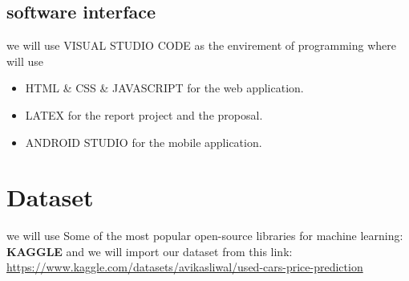 \documentclass[]{report}   %
\begin{document}
\subsection{software interface}
we will use VISUAL STUDIO CODE as the envirement of programming where will use 
\begin{itemize}
  \item [\ding{228}] HTML \& CSS \& JAVASCRIPT for the web application.\\ 
  \item [\ding{228}]  LATEX for the report project and the proposal.\\
  \item [\ding{228}]  ANDROID STUDIO for the mobile application.\\
\end{itemize}
  \section{Dataset}         %
  we will use Some of the most popular open-source libraries for machine learning:
\textbf{KAGGLE} and we will import our dataset from this link:  \url {https://www.kaggle.com/datasets/avikasliwal/used-cars-price-prediction}
\end{document}
